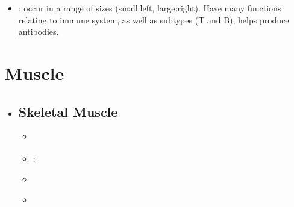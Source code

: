 \begin{itemize}
  \item {}: occur in a range of sizes (small:left, large:right). Have many functions relating to immune system, as well as subtypes (T and B), helps produce antibodies.

  \begin{center}
  \end{center}
\end{itemize}

\newpage
\section{Muscle}
\begin{itemize}
  \item []

  \subsection{Skeletal Muscle}
  \begin{multicols}{2}
  \begin{itemize}
  \item {}
  
  \begin{center}
  \end{center}

  \item {}:
  
  \begin{center}
  \end{center}

  \item {}
  
  \begin{center}
  \end{center}

  \vspace{45pt}

  \item {}
  
  \begin{center}
  \end{center}


\end{itemize}
\end{multicols}
\end{itemize}
